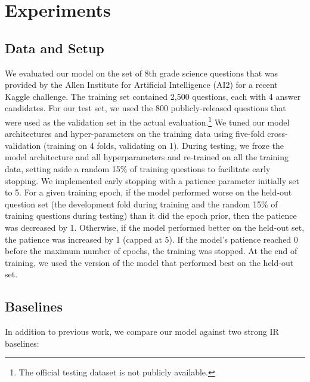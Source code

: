 \section{Experiments}
\label{sec-emnlp2017:experiments}

\subsection{Data and Setup}
We evaluated our model on the set of 8th grade science questions that was provided by the Allen Institute for Artificial Intelligence (AI2) for a recent Kaggle challenge.  The training set contained 2,500 questions, each with 4 answer candidates.  For our test set, we used the 800 publicly-released questions that were used as the validation set in the actual evaluation.\footnote{The official testing dataset is not publicly available.}  We tuned our model architectures and hyper-parameters on the training data using five-fold cross-validation (training on 4 folds, validating on 1).  During testing, we froze the model architecture and all hyperparameters and re-trained on all the training data, setting aside a random 15\% of training questions to facilitate early stopping.  We implemented early stopping with a patience parameter initially set to 5.  For a given training epoch, if the model performed worse on the held-out question set (the development fold during training and the random 15\% of training questions during testing) than it did the epoch prior, then the patience was decreased by 1.  Otherwise, if the model performed better on the held-out set, the patience was increased by 1 (capped at 5).  If the model's patience reached 0 before the maximum number of epochs, the training was stopped.  At the end of training, we used the version of the model that performed best on the held-out set.

\subsection{Baselines}
In addition to previous work, we compare our model against two strong IR baselines:
%

